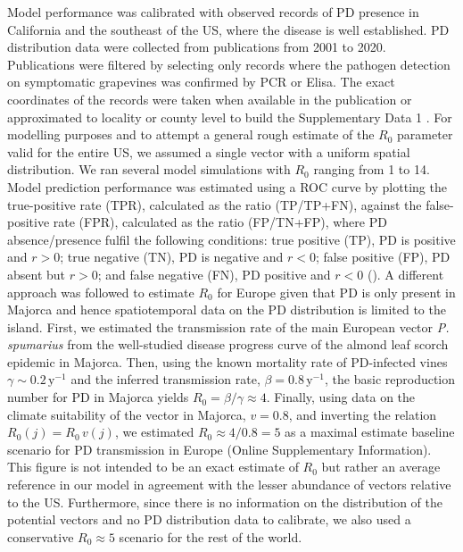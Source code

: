     Model performance was calibrated with observed records of PD presence in
    California and the southeast of the US, where the disease is well
    established.
    PD distribution data were collected from publications from 2001 to 2020.
    Publications were filtered by selecting only records where the pathogen
    detection on symptomatic grapevines was confirmed by PCR or Elisa. The
    exact
    coordinates of the records were taken when available in the publication or
    approximated to locality or county level to build the Supplementary Data 1
    \cite{Overall2015, Vanhove2019, Lieth2011, Anas2008, Hail2009,
        Wallingford2007,
        Myers2007, Albibi1998}. For modelling purposes and to attempt a general
    rough
    estimate of the $R_0$ parameter valid for the entire US, we assumed a
    single
    vector with a uniform spatial distribution. We ran several model
    simulations
    with $R_0$ ranging from 1 to 14.  Model prediction performance was
    estimated
    using a ROC curve by plotting the true-positive rate (TPR), calculated as
    the
    ratio (TP/TP+FN), against the false-positive rate (FPR), calculated as the
    ratio (FP/TN+FP), where PD absence/presence fulfil the following
    conditions:
    true positive (TP), PD is positive and $r>0$;  true negative (TN), PD is
    negative and $r<0$; false positive (FP), PD absent but $r>0$; and false
    negative (FN), PD positive and $r<0$ (\cite{jimenez2012insights}). A
    different
    approach was followed to estimate $R_0$ for Europe given that PD is only
    present in Majorca and hence spatiotemporal data on the PD distribution is
    limited to the island. First, we estimated the transmission rate of the
    main
    European vector \textit{P. spumarius} from the well-studied disease
    progress
    curve of the almond leaf scorch epidemic in Majorca. Then, using the known
    mortality rate of PD-infected vines $\gamma\sim 0.2 \, \textrm{y}^{-1}$ and
    the
    inferred transmission rate, $\beta=0.8 \, \textrm{y}^{-1}$, the basic
    reproduction number for PD in Majorca yields $R_0=\beta/\gamma\approx4$.
    Finally, using data on the climate suitability of the vector in Majorca,
$v=0.8$, and inverting the relation $R_0(j)=R_0\, v(j)$, we estimated
$R_0\approx 4/0.8=5$ as a maximal estimate baseline scenario for PD
    transmission in Europe (Online Supplementary Information). This figure is
    not intended
    to
    be an exact estimate of $R_0$ but rather an average reference in our model
    in
    agreement with the lesser abundance of vectors relative to the US.
    Furthermore,
    since there is no information on the distribution of the potential vectors
    and
    no PD distribution data to calibrate, we also used a conservative $R_0
\approx
5$ scenario for the rest of the world.


